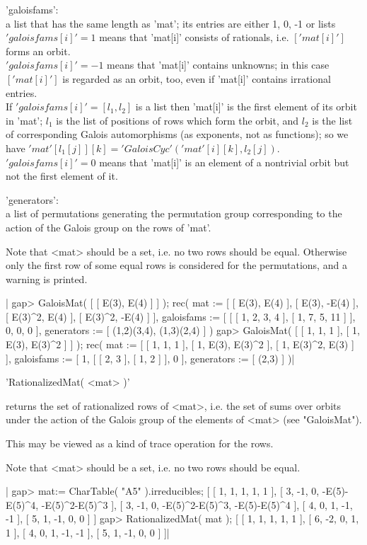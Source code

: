 'galoisfams':\\
      a list that has the same length as 'mat'; its entries are either
      1, 0, -1 or lists\:\\ $'galoisfams[i]'  = 1$ means that 'mat[i]'
      consists of rationals,  i.e. $[ 'mat[i]'  ]$  forms  an orbit.\\
      $'galoisfams[i]' =-1$  means that 'mat[i]' contains unknowns; in
      this case $[ 'mat[i]'  ]$ is regarded as  an orbit, too, even if
      'mat[i]' contains irrational entries.\\ If $'galoisfams[i]' =  [
      l_1, l_2 ]$ is  a list then 'mat[i]' is the first element of its
      orbit in  'mat'; $l_1$  is  the list of positions  of rows which
      form  the orbit, and $l_2$ is the  list of  corresponding Galois
      automorphisms  (as  exponents,  not  as  functions); so  we have
      $'mat'[  l_1[j] ][k]  =  'GaloisCyc'(  'mat'[i][k], l_2[j] )$.\\
      $'galoisfams[i]' =  0$  means that  'mat[i]'  is an element of a
      nontrivial orbit but not the first element of it.

'generators':\\
      a  list  of  permutations  generating  the   permutation   group
      corresponding  to the  action of the Galois group on the rows of
      'mat'.

Note  that <mat> should be a set,  i.e. no  two rows should be  equal.
Otherwise only the first row of some equal rows is  considered for the
permutations, and a warning is printed.

|    gap> GaloisMat( [ [ E(3), E(4) ] ] );
    rec(
      mat := [ [ E(3), E(4) ], [ E(3), -E(4) ], [ E(3)^2, E(4) ], 
          [ E(3)^2, -E(4) ] ],
      galoisfams := [ [ [ 1, 2, 3, 4 ], [ 1, 7, 5, 11 ] ], 0, 0, 0 ],
      generators := [ (1,2)(3,4), (1,3)(2,4) ] )
    gap> GaloisMat( [ [ 1, 1, 1 ], [ 1, E(3), E(3)^2 ] ] );
    rec(
      mat := [ [ 1, 1, 1 ], [ 1, E(3), E(3)^2 ], [ 1, E(3)^2, E(3) ] ],
      galoisfams := [ 1, [ [ 2, 3 ], [ 1, 2 ] ], 0 ],
      generators := [ (2,3) ] )|


'RationalizedMat( <mat> )'

returns the set  of rationalized rows of <mat>, i.e. the  set  of sums
over  orbits under the action  of the Galois  group of the elements of
<mat> (see "GaloisMat").

This may be viewed as a kind of trace operation for the rows.

Note that <mat> should be a set, i.e. no two rows should be equal.

|    gap> mat:= CharTable( "A5" ).irreducibles;
    [ [ 1, 1, 1, 1, 1 ], [ 3, -1, 0, -E(5)-E(5)^4, -E(5)^2-E(5)^3 ], 
      [ 3, -1, 0, -E(5)^2-E(5)^3, -E(5)-E(5)^4 ], [ 4, 0, 1, -1, -1 ], 
      [ 5, 1, -1, 0, 0 ] ]
    gap> RationalizedMat( mat );
    [ [ 1, 1, 1, 1, 1 ], [ 6, -2, 0, 1, 1 ], [ 4, 0, 1, -1, -1 ], 
      [ 5, 1, -1, 0, 0 ] ]|

